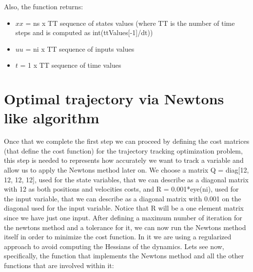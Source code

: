 \documentclass[a4paper,11pt,oneside]{book}
\begin{document}
\begin{flushleft}
    Also, the function returns:
\end{flushleft}
\begin{itemize}
    \item $xx$ = ns x TT sequence of states values (where TT is the number of time steps and is computed as int(ttValues[-1]/dt))
    \item $uu$ = ni x TT sequence of inputs values
    \item $t$ = 1 x TT sequence of time values
\end{itemize}
\section{Optimal trajectory via Newton\textquotesingle s like algorithm}
\begin{justify}
    {Once that we complete the first step we can proceed by defining the cost matrices (that define the cost function) for the trajectory tracking optimization problem, this step is needed to represents how accurately we want to track a variable and allow us to apply the Newton\textquotesingle s method later on. We choose a matrix Q = diag[12, 12, 12, 12], used for the state variables, that we can describe as a diagonal matrix with 12 as both positions and velocities costs, and R = 0.001*eye(ni), used for the input variable, that we can describe as a diagonal matrix with 0.001 on the diagonal used for the input variable. Notice that R will be a one element matrix since we have just one input. After defining a maximum number of iteration for the newton\textquotesingle s method and a tolerance for it, we can now run the Newton\textquotesingle s method itself in order to minimize the cost function. In it we are using a regularized approach to avoid computing the Hessians of the dynamics.
    Let\textquotesingle s see now, specifically, the function that implements the Newton\textquotesingle s method and all the other functions that are involved within it:}
\end{justify}
\end{document}
